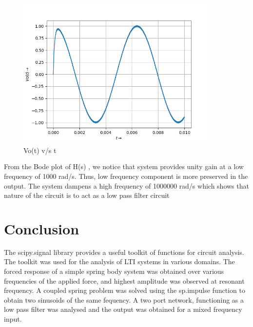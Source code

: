 \documentclass[10pt,a4paper]{article}
\begin{document}
\begin{figure}[!tbh]

\includegraphics[width = 0.9\textwidth]{7.png}
\caption{Vo(t) v/s t}

\end{figure}

From the Bode plot of H(s) , we notice that system provides unity gain at a low frequency of 1000 rad/s. Thus, low frequency component is more preserved in the output. The system dampens a high frequency of 1000000 rad/s which shows that nature of the circuit is to act as a low pass filter circuit


\section{Conclusion}

The scipy.signal library provides a useful toolkit of functions for circuit analysis. The toolkit was used for the analysis of LTI systems in various domains. The forced response of a simple spring body system was obtained over various frequencies of the applied force, and highest amplitude was observed at resonant frequency. A coupled spring problem was solved using the sp.impulse function to obtain two sinusoids of the same fequency. A two port network, functioning as a low pass filter was analysed and the output was obtained for a mixed frequency input.
\end{document}
